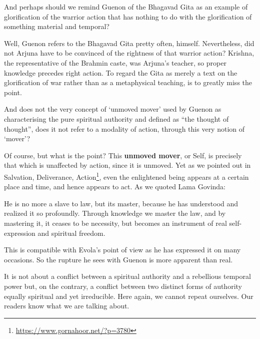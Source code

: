 \begin{quotex}
And perhaps should we remind Guenon of the Bhagavad Gita as an example of glorification of the warrior action that has nothing to do with the glorification of something material and temporal?
\end{quotex}


Well, Guenon refers to the Bhagavad Gita pretty often, himself. Nevertheless, did not Arjuna have to be convinced of the rightness of that warrior action? Krishna, the representative of the Brahmin caste, was Arjuna's teacher, so proper knowledge precedes right action. To regard the Gita as merely a text on the glorification of war rather than as a metaphysical teaching, is to greatly miss the point.

\begin{quotex}
And does not the very concept of `unmoved mover' used by Guenon as characterising the pure spiritual authority and defined as ``the thought of thought'', does it not refer to a modality of action, through this very notion of `mover'?
\end{quotex}


Of course, but what is the point? This \textbf{unmoved mover}, or Self, is precisely that which is unaffected by action, since it is unmoved. Yet as we pointed out in Salvation, Deliverance, Action\footnote{\url{https://www.gornahoor.net/?p=3780}}, even the enlightened being appears at a certain place and time, and hence appears to act. As we quoted Lama Govinda:

\begin{quotex}
He is no more a slave to law, but its master, because he has understood and realized it so profoundly. Through knowledge we master the law, and by mastering it, it ceases to be necessity, but becomes an instrument of real self-expression and spiritual freedom.
\end{quotex}


This is compatible with Evola's point of view as he has expressed it on many occasions. So the rupture he sees with Guenon is more apparent than real.

\begin{quotex}
It is not about a conflict between a spiritual authority and a rebellious temporal power but, on the contrary, a conflict between two distinct forms of authority equally spiritual and yet irreducible. Here again, we cannot repeat ourselves. Our readers know what we are talking about.
\end{quotex}


